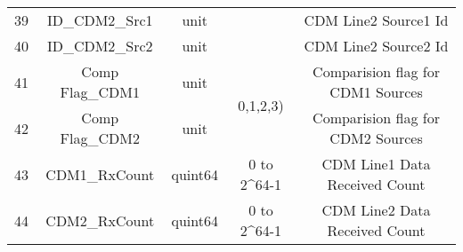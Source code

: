\begin{landscape}
\begin{longtable}[c]{|c|c|c|c|c|}
		39             & ID\_CDM2\_Src1                                                           & unit               &                                                                                                                                                                                           & CDM Line2 Source1 Id                                                                                    \\ \cline{1-3} \cline{5-5} 
		40             & ID\_CDM2\_Src2                                                           & unit               &                                                                                                                                                                                           & CDM Line2 Source2 Id                                                                                    \\ \hline
		41             & Comp Flag\_CDM1                                                          & unit               & \multirow{2}{*}{0,1,2,3) }                                                                                                                                                                  & Comparision flag for CDM1 Sources                                                                       \\ \cline{1-3} \cline{5-5} 
		42             & Comp Flag\_CDM2                                                          & unit               &                                                                                                                                                                                           & Comparision flag for CDM2 Sources                                                                       \\ \hline
		43             & CDM1\_RxCount                                                            & quint64            & 0 to 2\textasciicircum 64-1                                                                                                                                                               & CDM Line1 Data Received Count                                                                           \\ \hline
		44             & CDM2\_RxCount                                                            & quint64            & 0 to 2\textasciicircum 64-1                                                                                                                                                               & CDM Line2 Data Received Count                                                                           \\ \hline

\end{longtable}
\end{landscape}

